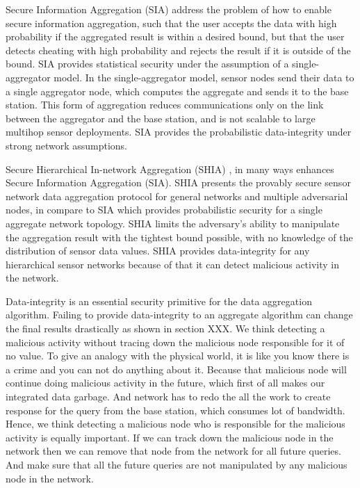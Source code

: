 	Secure Information Aggregation (SIA) \cite{przydatek2003sia}  address the problem of how to enable secure information aggregation, such that the user accepts the data with high probability if the aggregated result is within a desired bound, but that the user detects cheating with high probability and rejects the result if it is outside of the bound.
	SIA provides statistical security under the assumption of a single-aggregator model.
	In the single-aggregator model, sensor nodes send their data to a single
	aggregator node, which computes the aggregate and sends it to the
	base station.
	This form of aggregation reduces communications only on the link between the aggregator and the base station, and is not scalable to large multihop sensor deployments.
	SIA provides the probabilistic data-integrity under strong network assumptions.

	Secure Hierarchical In-network Aggregation (SHIA) \cite{chan2006secure}, in many ways enhances Secure Information Aggregation (SIA).
	SHIA presents the provably secure sensor network data aggregation protocol for general networks and multiple adversarial nodes, in compare to SIA which provides probabilistic security for a single aggregate network topology.
	SHIA limits the adversary’s ability to manipulate the aggregation result with the tightest bound possible, with no knowledge of the distribution of sensor data values.
	SHIA provides data-integrity for any hierarchical sensor networks because of that it can detect malicious activity in the network.

	Data-integrity is an essential security primitive for the data aggregation algorithm.
	Failing to provide data-integrity to an aggregate algorithm can change the final results drastically as shown in section XXX.
	We think detecting a malicious activity without tracing down the malicious node responsible for it of no value.
	To give an analogy with the physical world, it is like you know there is a crime and you can not do anything about it.
	Because that malicious node will continue doing malicious activity in the future, which first of all makes our integrated data garbage. 
	And network has to redo the all the work to create response for the query from the base station, which consumes lot of bandwidth. 
	Hence, we think detecting a malicious node who is responsible for the malicious activity is equally important.
	If we can track down the malicious node in the network then we can remove that node from the network for all future queries.
	And make sure that all the future queries are not manipulated by any malicious node in the network.

